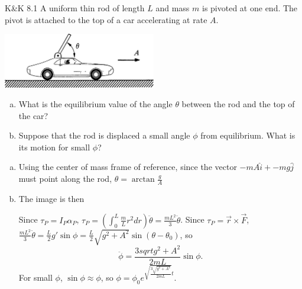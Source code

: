 \documentclass{esg8012pset}
\begin{document}
\begin{problem}{K\&K 8.1}
  A uniform thin rod of length $L$ and mass $m$ is pivoted at one end. The pivot is attached to the top of a car accelerating at rate $A$.
  \begin{center}\includegraphics[width=0.5\textwidth]{ps11_3}\end{center}
  \begin{enumerate}[(a)]
    \item What is the equilibrium value of the angle $\theta$ between the rod and the top of the car?
    \item Suppose that the rod is displaced a small angle $\phi$ from equilibrium. What is its motion for small $\phi$?
  \end{enumerate}
\end{problem}
\begin{solution}
\begin{enumerate}[(a)]
  \item Using the center of mass frame of reference, since the vector $-mA\hat i + - m g \hat j$ must point along the rod, $\theta = \arctan \frac{g}{A}$
  \item The image is then \begin{center} 
 \end{center} Since $\tau_P = I_{P} \alpha_P$, $\tau_P = \left(\int_0^L \frac{m}{L} r^2 d r \right) \ddot \theta = \frac{mL^2}{3} \ddot \theta$.  Since $\tau_P = \vec r \times \vec F$, $\frac{mL^2}{3} \ddot \theta = \frac{L}{2} g'\sin\phi = \frac{L}{2}\sqrt{g^2 + A^2}\sin(\theta-\theta_0)$, so $$\ddot \phi = \frac{3sqrt{g^2+A^2}}{2 m L}\sin\phi.$$  For small $\phi$, $\sin\phi \approx \phi$, so $\phi = \phi_0 e^{\sqrt{\frac{3\sqrt{g^2+A^2}}{2 m L}}t}$.
\end{enumerate}
\end{solution}
\end{document}
